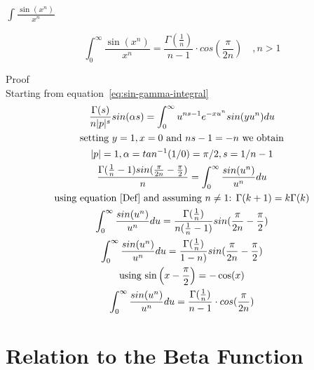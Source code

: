 \documentclass[a4paper]{article}
\begin{document}
    \subsubsection{$\int \frac{\sin(x^n)}{x^n}$}

    \begin{theorem}
        \begin{equation}
            \boxed{
                \int_{0}^{\infty} \frac{\sin(x^n)}{x^n} = \frac{\Gamma(\frac{1}{n})}{n-1} \cdot cos(\frac{\pi}{2n})
                \quad ,   n > 1
            }\label{eq:equation22}
        \end{equation}

        Proof
        \\
        Starting from equation~\ref{eq:sin-gamma-integral}
        \begin{gather*}
            \frac{\Gamma(s)}{n |p|^s} sin(\alpha s)= \int_{0}^{\infty} u^{ns -1} e^{-x u^{n}} sin(y u^n) du
            \\
            \text{setting $y=1, x=0$ and $ns -1 = -n$ we obtain}
            \\
            |p| = 1, \alpha = tan^{-1}(1/0) = \pi/2, s = 1/n -1
            \\
            \frac{\Gamma(\frac{1}{n} - 1) sin(\frac{\pi}{2n} - \frac{\pi}{2})}{n} = \int_{0}^{\infty} \frac{sin(u^n)}{u^n} du
            \\
            \text{using equation~\ref{Def} and assuming $n \neq 1$: } \Gamma(k+1) = k \Gamma(k)
            \\
            \int_{0}^{\infty} \frac{sin(u^n)}{u^n} du = \frac{\Gamma(\frac{1}{n})}{n (\frac{1}{n} -1 ) }  sin(\frac{\pi}{2n} - \frac{\pi}{2})
            \\
            \int_{0}^{\infty} \frac{sin(u^n)}{u^n} du = \frac{\Gamma(\frac{1}{n})}{1 - n )}  sin(\frac{\pi}{2n} - \frac{\pi}{2})
            \\
            \text{using $\sin\left(x - \frac{\pi}{2}\right) = - \cos(x)$}
            \\
            \int_{0}^{\infty} \frac{sin(u^n)}{u^n} du = \frac{\Gamma(\frac{1}{n})}{n-1} \cdot cos(\frac{\pi}{2n})
        \end{gather*}
    \end{theorem}

    \pagebreak


    \section{Relation to the Beta Function}\label{sec:relation-to-the-beta-function}
\end{document}
